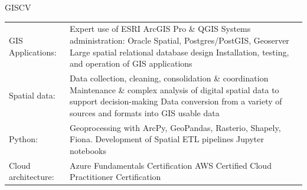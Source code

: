 \documentclass[letterpaper]{article}
\newenvironment{skillslist}
        {
            \begin{tabular}[t]{ l L{5.17in} }
        }{
            \end{tabular}
        }
\begin{document}
    \begin{taggedblock}{GISCV}
        \begin{skillslist}
            GIS Applications:&
                Expert use of ESRI ArcGIS Pro \& QGIS \linebreak
                Systems administration: Oracle Spatial, Postgres/PostGIS, Geoserver \linebreak
                Large spatial relational database design \linebreak
                Installation, testing, and operation of GIS applications \linebreak
                \\
            Spatial data:&
                Data collection, cleaning, consolidation \& coordination \linebreak
                Maintenance \& complex analysis of digital spatial data to support decision-making \linebreak
                Data conversion from a variety of sources and formats into GIS usable data \linebreak
                \\
            Python:&
                Geoprocessing with ArcPy, GeoPandas, Rasterio, Shapely, Fiona. \linebreak
                Development of Spatial ETL pipelines \linebreak
                Jupyter notebooks \linebreak
                \\
            Cloud architecture:&
                Azure Fundamentals Certification \linebreak
                AWS Certified Cloud Practitioner Certification \linebreak

\end{skillslist}
\end{taggedblock}
\end{document}
